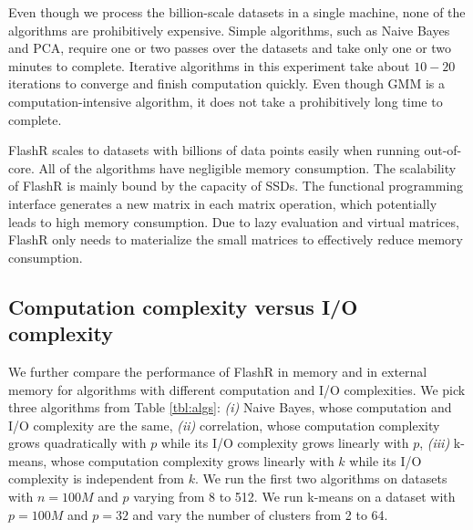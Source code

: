 Even though we process the billion-scale datasets in a single machine, none of
the algorithms are prohibitively expensive. Simple algorithms, such as
Naive Bayes and PCA, require one or two passes over the datasets and take
only one or two minutes to complete. Iterative algorithms in this experiment
take about $10-20$ iterations to converge and finish computation quickly.
Even though GMM is a computation-intensive algorithm, it does not take
a prohibitively long time to complete.

FlashR scales to datasets with billions of data points easily when running
out-of-core. All of the algorithms have negligible memory consumption.
The scalability of FlashR is mainly bound by the capacity of SSDs.
The functional programming
interface generates a new matrix in each matrix operation, which potentially
leads to high memory consumption. Due to lazy evaluation and virtual matrices,
FlashR only needs to materialize the small matrices to effectively reduce
memory consumption.

\subsection{Computation complexity versus I/O complexity}
We further compare the performance of FlashR in memory and in external memory
for algorithms with different computation and I/O complexities.
We pick three algorithms from Table \ref{tbl:algs}: \textit{(i)} Naive Bayes,
whose computation and I/O complexity are the same, \textit{(ii)}
correlation, whose computation complexity grows quadratically with $p$ while
its I/O complexity grows linearly with $p$, \textit{(iii)} k-means, whose computation
complexity grows linearly with $k$ while its I/O complexity is independent
from $k$. We run the first two algorithms on datasets with $n=100M$ and $p$
varying from 8 to 512. We run k-means on a dataset with $p=100M$ and $p=32$
and vary the number of clusters from 2 to 64.

